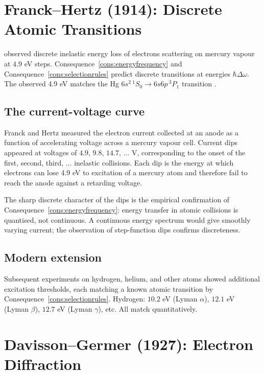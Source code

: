 \documentclass[11pt,twocolumn,a4paper]{article}
\theoremstyle{axiomstyle}
\theoremstyle{conseqstyle}
\theoremstyle{definition}
\theoremstyle{remark}
\begin{document}
\section{Franck--Hertz (1914): Discrete Atomic Transitions}
\label{sec:frankhertz}

\citet{franckhertz1914} observed discrete inelastic energy loss of electrons scattering on mercury vapour at $4.9$ eV steps. Consequence~\ref{cons:energyfrequency} and Consequence~\ref{cons:selectionrules} predict discrete transitions at energies $\hbar\Delta\omega$. The observed 4.9 eV matches the Hg $6s^{2}\,^{1}S_{0}\to 6s6p\,^{3}P_{1}$ transition \citep{nistasd}.

\subsection{The current-voltage curve}

Franck and Hertz measured the electron current collected at an anode as a function of accelerating voltage across a mercury vapour cell. Current dips appeared at voltages of $4.9$, $9.8$, $14.7$, $\ldots$ V, corresponding to the onset of the first, second, third, $\ldots$ inelastic collisions. Each dip is the energy at which electrons can lose 4.9 eV to excitation of a mercury atom and therefore fail to reach the anode against a retarding voltage.

The sharp discrete character of the dips is the empirical confirmation of Consequence~\ref{cons:energyfrequency}: energy transfer in atomic collisions is quantised, not continuous. A continuous energy spectrum would give smoothly varying current; the observation of step-function dips confirms discreteness.

\subsection{Modern extension}

Subsequent experiments on hydrogen, helium, and other atoms showed additional excitation thresholds, each matching a known atomic transition by Consequence~\ref{cons:selectionrules}. Hydrogen: $10.2$ eV (Lyman $\alpha$), $12.1$ eV (Lyman $\beta$), $12.7$ eV (Lyman $\gamma$), etc. All match quantitatively.

\section{Davisson--Germer (1927): Electron Diffraction}
\label{sec:dg}
\end{document}
